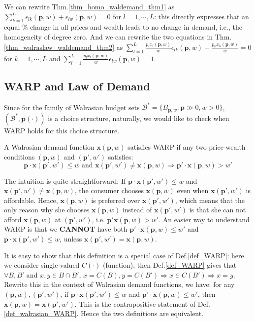 We can rewrite Thm.\ref{thm_homo_waldemand_thm1} as $\sum^L_{k=1}\epsilon_{lk}(\mathbf{p},w)+\epsilon_{lw}(\mathbf{p},w)=0$ for $l=1,\cdots,L$: this directly expresses that an equal \% change in all prices and wealth leads to no change in demand, i.e., the homogeneity of degree zero.
And we can rewrite the two equations in Thm.\ref{thm_walraslaw_waldemand_thm2} as $\sum^L_{l=1}\frac{p_lx_l(\mathbf{p},w)}{w}\epsilon_{lk}(\mathbf{p},w)+\frac{p_kx_k(\mathbf{p},w)}{w}=0$ for $k=1,\cdots,L$ and $\sum^L_{l=1}\frac{p_lx_l(\mathbf{p},w)}{w}\epsilon_{lw}(\mathbf{p},w)=1$.

\subsection{WARP and Law of Demand}
Since for the family of Walrasian budget sets $\mathcal{B}^*=\{B_{\mathbf{p},w}:\mathbf{p}\gg 0,w>0\}$, $(\mathcal{B}^*,\mathbf{p}(\cdot))$ is a choice structure, naturally, we would like to check when WARP holds for this choice structure.

\begin{definition}\label{def_walrasian_WARP}
    A Walrasian demand function $\mathbf{x}(\mathbf{p},w)$ satisfies WARP if any two price-wealth conditions $(\mathbf{p},w)$ and $(\mathbf{p}',w')$ satisfies:
    $$\mathbf{p}\cdot \mathbf{x}(\mathbf{p}',w')\leq w\text{ and }\mathbf{x}(\mathbf{p}',w')\neq \mathbf{x}(\mathbf{p},w)\Rightarrow \mathbf{p}'\cdot\mathbf{x}(\mathbf{p},w)>w'$$
\end{definition}

The intuition is quite straightforward: If $\mathbf{p}\cdot \mathbf{x}(\mathbf{p}',w')\leq w$ and $\mathbf{x}(\mathbf{p}',w')\neq \mathbf{x}(\mathbf{p},w)$, the consumer chooses $\mathbf{x}(\mathbf{p},w)$ even when $\mathbf{x}(\mathbf{p}',w')$ is affordable. Hence, $\mathbf{x}(\mathbf{p},w)$ is preferred over $\mathbf{x}(\mathbf{p}',w')$, which means that the only reason why she chooses $\mathbf{x}(\mathbf{p},w)$ instead of $\mathbf{x}(\mathbf{p}',w')$ is that she can not afford $\mathbf{x}(\mathbf{p},w)$ at $(\mathbf{p}',w')$, i.e. $\mathbf{p}'\mathbf{x}(\mathbf{p},w)>w'$. An easier way to understand WARP is that we \textbf{CANNOT} have both $\mathbf{p}'\cdot \mathbf{x}(\mathbf{p},w)\leq w'$ and $\mathbf{p}\cdot \mathbf{x}(\mathbf{p}',w')\leq w$, unless $\mathbf{x}(\mathbf{p}',w')=\mathbf{x}(\mathbf{p},w)$.

It is easy to show that this definition is a special case of Def.\ref{def_WARP}: here we consider single-valued $C(\cdot)$ (function), then Def.\ref{def_WARP} gives that $\forall B,B'$ and $x,y\in B\cap B'$, $x=C(B),y=C(B')\Rightarrow x\in C(B')\Rightarrow x=y$. Rewrite this in the context of Walrasian demand functions, we have: for any $(\mathbf{p},w),(\mathbf{p}',w')$, if $\mathbf{p}\cdot\mathbf{x}(\mathbf{p}',w')\leq w$ and $\mathbf{p}'\cdot \mathbf{x}(\mathbf{p},w)\leq w'$, then $\mathbf{x}(\mathbf{p},w)=\mathbf{x}(\mathbf{p'},w')$. This is the contrapositive statement of Def.\ref{def_walrasian_WARP}. Hence the two definitions are equivalent.

